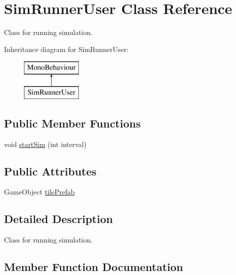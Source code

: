 \hypertarget{class_sim_runner_user}{}\section{Sim\+Runner\+User Class Reference}
\label{class_sim_runner_user}


Class for running simulation.  


Inheritance diagram for Sim\+Runner\+User\+:\begin{figure}[H]
\begin{center}
\leavevmode
\includegraphics[height=2.000000cm]{class_sim_runner_user}
\end{center}
\end{figure}
\subsection*{Public Member Functions}
\begin{DoxyCompactItemize}
\item 
void \mbox{\hyperlink{class_sim_runner_user_a8e0173173b2f5dc76cd4f280f9978897}{start\+Sim}} (int interval)
\end{DoxyCompactItemize}
\subsection*{Public Attributes}
\begin{DoxyCompactItemize}
\item 
Game\+Object \mbox{\hyperlink{class_sim_runner_user_a049fcb968076857e64527f1ed6645284}{tile\+Prefab}}
\end{DoxyCompactItemize}


\subsection{Detailed Description}
Class for running simulation. 



\subsection{Member Function Documentation}
\mbox{\label{class_sim_runner_user_a8e0173173b2f5dc76cd4f280f9978897}} 
